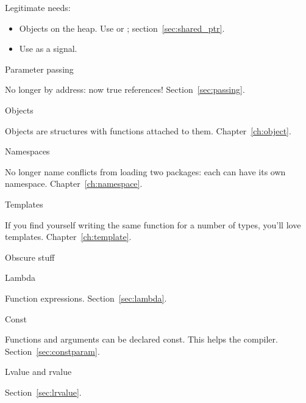 Legitimate needs:
\begin{itemize}
\item Objects on the heap. Use  or
  ; section~\ref{sec:shared_ptr}.
\item Use  as a signal.
\end{itemize}

 {Parameter passing}

No longer by address: now true references! Section~\ref{sec:passing}.

 {Objects}

Objects are structures with functions attached to
them. Chapter~\ref{ch:object}.

 {Namespaces}

No longer name conflicts from loading two packages: each can have its
own namespace. Chapter~\ref{ch:namespace}.

 {Templates}

If you find yourself writing the same function for a number of types,
you'll love templates. Chapter~\ref{ch:template}.

 {Obscure stuff}

 {Lambda}

Function expressions.
Section~\ref{sec:lambda}.

 {Const}

Functions and arguments can be declared const. This helps the
compiler. Section~\ref{sec:constparam}.

 {Lvalue and rvalue}

Section~\ref{sec:lrvalue}.

\endinput

You’ll have no destructors, so cleanup is manual. This is most fun
with early-return functions, but it can keep you entertained for all
cases. File handles, memory, and other resources (thread locks,
anyone) are all waiting patiently and silently for you to forget them.

Initialization has be be explicitly called. No constructors either.

Want inheritance? Sure. Write your own vtable (often done with function pointers in a struct).
Instead of templates, you’ll need to abandon type safety and cast back and forth to (void*). Don’t explicitly cast to (void *), because the compiler never warns about explicit or implicit casts to and from (void *).

You’ll also need to make sure you’re using the right library calls - snprintf versus sprintf etc. Hopefully an existing project will be using the right ones.

